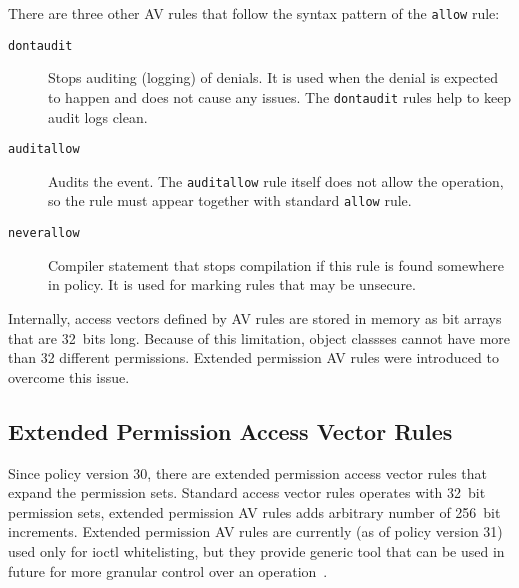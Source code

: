 There are three other AV rules that follow the syntax pattern of the
\texttt{allow} rule:
\begin{description}
    \item [\texttt{dontaudit}] Stops auditing (logging) of denials. It is used
        when the denial is expected to happen and does not cause any issues. The
        \texttt{dontaudit} rules help to keep audit logs clean.
    \item [\texttt{auditallow}] Audits the event. The \texttt{auditallow} rule
        itself does not allow the operation, so the rule must appear together
        with standard \texttt{allow} rule.
    \item [\texttt{neverallow}] Compiler statement that stops compilation if
        this rule is found somewhere in policy. It is used for marking rules
        that may be unsecure.
\end{description}
Internally, access vectors defined by AV rules are stored in memory as bit
arrays that are 32~bits long. Because of this limitation, object classses cannot
have more than 32 different permissions. Extended permission AV rules were
introduced to overcome this issue.

\subsection{Extended Permission Access Vector Rules}
\label{extavrules}

Since policy version 30, there are extended permission access vector rules that
expand the permission sets. Standard access vector rules operates with 32~bit
permission sets, extended permission AV rules adds arbitrary number of 256~bit
increments. Extended permission AV rules are currently (as of policy version 31)
used only for ioctl whitelisting, but they provide generic tool that can be used
in future for more granular control over an operation~\cite{selinuxmailxperms}.


